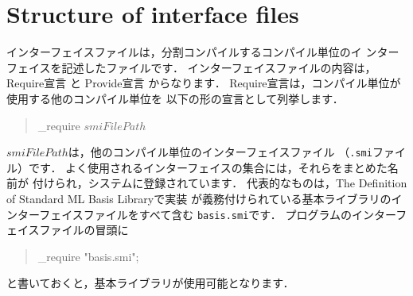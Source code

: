 \documentclass{jbook}
\newif\ifjp
\newcommand{\txt}[2]{#2}
\newenvironment{program}{\begin{quote}\begin{tt}}%
                        {\end{tt}\end{quote}}
\begin{document}
\section{\txt{インターフェイスファイルの構造}{Structure of interface files}}
\label{sec:tutorialInterfaceFile}

\ifjp%
	インターフェイスファイルは，分割コンパイルするコンパイル単位のイ
ンターフェイスを記述したファイルです．
	インターフェイスファイルの内容は，
Require宣言
と
Provide宣言
からなります．
	Require宣言は，コンパイル単位が使用する他のコンパイル単位を
以下の形の宣言として列挙します．
\begin{program}
\_require $smiFilePath$
\end{program}
	$smiFilePath$は，他のコンパイル単位のインターフェイスファイル
（{\tt .smi}ファイル）です．
	よく使用されるインターフェイスの集合には，それらをまとめた名前が
付けられ，システムに登録されています．
	代表的なものは，The Definition of Standard ML Basis Libraryで実装
が義務付けられている基本ライブラリのインターフェイスファイルをすべて含む
{\tt basis.smi}です．
	プログラムのインターフェイスファイルの冒頭に
\begin{program}
\_require "basis.smi";
\end{program}
と書いておくと，基本ライブラリが使用可能となります．
\end{document}
